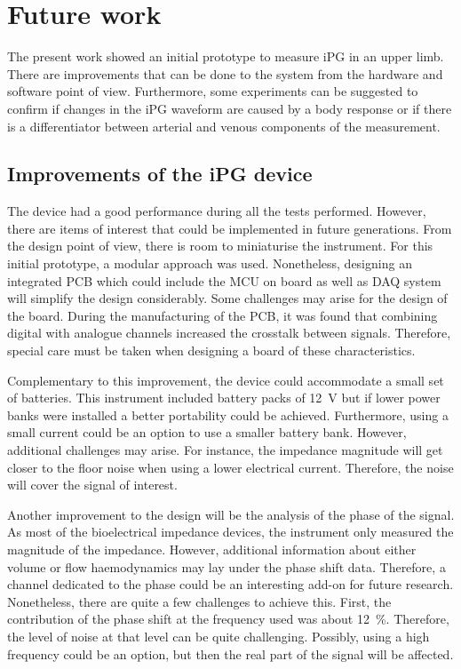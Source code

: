 
\section{Future work}
The present work showed an initial prototype to measure iPG in an upper limb. There are improvements that can be done to the system from the hardware and software point of view. Furthermore, some experiments can be suggested to confirm if changes in the iPG waveform are caused by a body response or if there is a differentiator between arterial and venous components of the measurement. 

\subsection{Improvements of the iPG device}
The device had a good performance during all the tests performed. However, there are items of interest that could be implemented in future generations. From the design point of view, there is room to miniaturise the instrument. For this initial prototype, a modular approach was used. Nonetheless, designing an integrated PCB which could include the MCU on board as well as DAQ system will simplify the design considerably. Some challenges may arise for the design of the board. During the manufacturing of the PCB, it was found that combining digital with analogue channels increased the crosstalk between signals. Therefore, special care must be taken when designing a board of these characteristics. 

Complementary to this improvement, the device could accommodate a small set of batteries. This instrument included battery packs of \SI{12}{\volt} but if lower power banks were installed a better portability could be achieved. Furthermore, using a small current could be an option to use a smaller battery bank. However, additional challenges may arise. For instance, the impedance magnitude will get closer to the floor noise when using a  lower electrical current. Therefore, the noise will cover the signal of interest. 

Another improvement to the design will be the analysis of the phase of the signal. As most of the bioelectrical impedance devices, the instrument only measured the magnitude of the impedance. However, additional information about either volume or flow haemodynamics may lay under the phase shift data. Therefore, a channel dedicated to the phase could be an interesting add-on for future research. Nonetheless, there are quite a few challenges to achieve this. First, the contribution of the phase shift at the frequency used was about \SI{12}{\percent}. Therefore, the level of noise at that level can be quite challenging. Possibly, using a high frequency could be an option, but then the real part of the signal will be affected.

